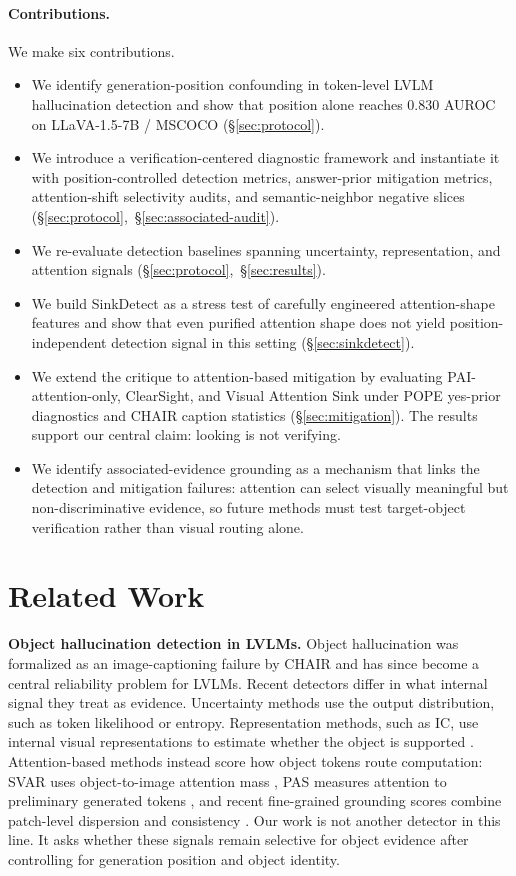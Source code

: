 \documentclass[letterpaper]{article} \usepackage[submission]{aaai2027}  \usepackage[hyphens]{url}  \usepackage{graphicx} \urlstyle{rm} \def\UrlFont{\rm}  \usepackage{natbib}  \usepackage{caption} \frenchspacing
\begin{document}
\paragraph{Contributions.} We make six contributions.
\begin{itemize}
\item We identify generation-position confounding in token-level LVLM hallucination detection and show that position alone reaches $0.830$ AUROC on LLaVA-1.5-7B / MSCOCO (\S\ref{sec:protocol}).
\item We introduce a verification-centered diagnostic framework and instantiate it with position-controlled detection metrics, answer-prior mitigation metrics, attention-shift selectivity audits, and semantic-neighbor negative slices (\S\ref{sec:protocol},~\S\ref{sec:associated-audit}).
\item We re-evaluate detection baselines spanning uncertainty, representation, and attention signals (\S\ref{sec:protocol},~\S\ref{sec:results}).
\item We build SinkDetect as a stress test of carefully engineered attention-shape features and show that even purified attention shape does not yield position-independent detection signal in this setting (\S\ref{sec:sinkdetect}).
\item We extend the critique to attention-based mitigation by evaluating PAI-attention-only, ClearSight, and Visual Attention Sink under POPE yes-prior diagnostics and CHAIR caption statistics (\S\ref{sec:mitigation}). The results support our central claim: looking is not verifying.
\item We identify associated-evidence grounding as a mechanism that links the detection and mitigation failures: attention can select visually meaningful but non-discriminative evidence, so future methods must test target-object verification rather than visual routing alone.
\end{itemize}
 \section{Related Work}
\label{sec:related}

\noindent\textbf{Object hallucination detection in LVLMs.}
Object hallucination was formalized as an image-captioning failure by CHAIR \cite{rohrbach2018chair} and has since become a central reliability problem for LVLMs. Recent detectors differ in what internal signal they treat as evidence. Uncertainty methods use the output distribution, such as token likelihood or entropy. Representation methods, such as IC, use internal visual representations to estimate whether the object is supported \cite{jiang2024interpreting}. Attention-based methods instead score how object tokens route computation: SVAR uses object-to-image attention mass \cite{jiang2024devils}, PAS measures attention to preliminary generated tokens \cite{hoangxuan2026pas}, and recent fine-grained grounding scores combine patch-level dispersion and consistency \cite{beyond2026global}. Our work is not another detector in this line. It asks whether these signals remain selective for object evidence after controlling for generation position and object identity.
\end{document}
